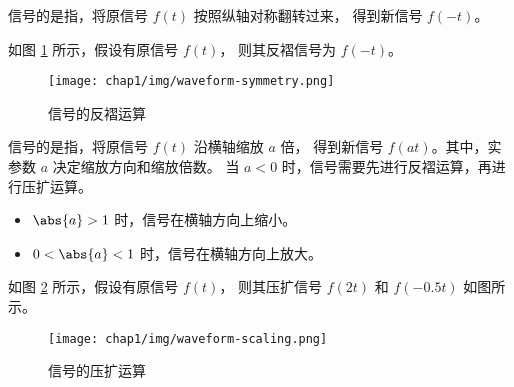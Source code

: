 \begin{definition}[反褶运算]
    信号的是指，将原信号 $f(t)$ 按照纵轴对称翻转过来，
    得到新信号 $f(-t)$。
\end{definition}

\begin{example}
    如图 \ref{fig:waveform-symmetry} 所示，假设有原信号 $f(t)$，
    则其反褶信号为 $f(-t)$。
    \begin{figure}[H]
        \centering
        \texttt{[image: chap1/img/waveform-symmetry.png]}
        \caption{信号的反褶运算}
        \label{fig:waveform-symmetry}
    \end{figure}
\end{example}

\begin{definition}[压扩运算]
    信号的是指，将原信号 $f(t)$ 沿横轴缩放 $a$ 倍，
    得到新信号 $f(at)$。其中，实参数 $a$ 决定缩放方向和缩放倍数。
    当 $a < 0$ 时，信号需要先进行反褶运算，再进行压扩运算。
    \begin{itemize}
        \item $\abs{a} > 1$ 时，信号在横轴方向上缩小。
        \item $0 < \abs{a} < 1$ 时，信号在横轴方向上放大。
    \end{itemize}
\end{definition}

\begin{example}
    如图 \ref{fig:waveform-scaling} 所示，假设有原信号 $f(t)$，
    则其压扩信号 $f(2t)$ 和 $f(-0.5t)$ 如图所示。
    \begin{figure}[H]
        \centering
        \texttt{[image: chap1/img/waveform-scaling.png]}
        \caption{信号的压扩运算}
        \label{fig:waveform-scaling}
    \end{figure}
\end{example}

